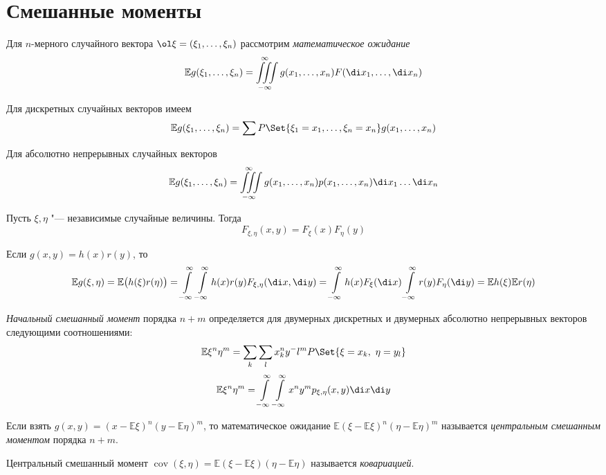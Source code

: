 \section{Смешанные моменты}

\begin{definition}
	Для $ n $-мерного случайного вектора $ \ol\xi = (\xi_1, \dots, \xi_n) $ рассмотрим
	\emph{математическое ожидание}
	$$ \mathbb E g(\xi_1, \dots, \xi_n) = \iiint\limits_{-\infty}^\infty g(x_1, \dots, x_n)
	F(\di x_1, \dots, \di x_n) $$

	Для дискретных случайных векторов имеем
	$$ \mathbb Eg(\xi_1, \dots, \xi_n) = \sum P\Set{\xi_1 = x_1, \dots, \xi_n = x_n}
	g(x_1, \dots, x_n) $$

	Для абсолютно непрерывных случайных векторов
	$$ \mathbb Eg(\xi_1, \dots, \xi_n) = \iiint\limits_{-\infty}^\infty g(x_1, \dots, x_n)
	p(x_1, \dots, x_n) \di x_1 \dots \di x_n $$
\end{definition}

Пусть $ \xi, \eta $ "--- независимые случайные величины.
Тогда
$$ F_{\xi, \eta}(x, y) = F_\xi(x)F_\eta(y) $$

\begin{statement}
	Если $ g(x, y) = h(x)r(y) $, то
	$$ \mathbb Eg(\xi, \eta) = \mathbb E \bigl( h(\xi)r(\eta) \bigr) =
	\int\limits_{-\infty}^\infty \int\limits_{-\infty}^\infty h(x)r(y) F_{\xi, \eta}(\di x, \di y) =
	\int\limits_{-\infty}^\infty h(x)F_\xi(\di x) \int\limits_{-\infty}^\infty r(y) F_\eta(\di y) =
	\mathbb Eh(\xi) \mathbb E r(\eta) $$
\end{statement}

\begin{definition}
	\emph{Начальный смешанный момент} порядка $ n + m $ определяется для двумерных дискретных и
	двумерных абсолютно непрерывных векторов следующими соотношениями:
	$$ \mathbb E\xi^n \eta^m = \sum_k \sum_l x_k^n y^-l^m P\Set{\xi = x_k, ~ \eta = y_l} $$
	$$ \mathbb E\xi^n\eta^m = \int\limits_{-\infty}^\infty \int\limits_{-\infty}^\infty x^ny^m
	p_{\xi, \eta}(x, y) \di x \di y $$
\end{definition}

\begin{definition}
	Если взять $ g(x, y) = (x - \mathbb E\xi)^n (y - \mathbb E\eta)^m $, то математическое ожидание
	$ \mathbb E(\xi - \mathbb E\xi)^n(\eta - \mathbb E \eta)^m $ называется
	\emph{центральным смешанным моментом} порядка $ n + m $.
\end{definition}

\begin{definition}
	Центральный смешанный момент $ \operatorname{cov}(\xi, \eta) =
	\mathbb E(\xi - \mathbb E\xi)(\eta - \mathbb E \eta) $ называется \emph{ковариацией}.
\end{definition}

